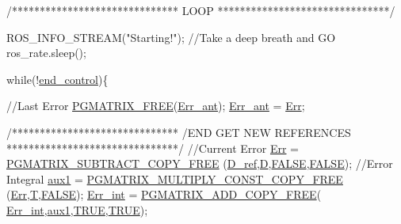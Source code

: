 \begin{DoxyCode}
        \textcolor{comment}{/******************************}
\textcolor{comment}{                        LOOP}
\textcolor{comment}{        *******************************/}

        ROS\_INFO\_STREAM(\textcolor{stringliteral}{"Starting!"});
        \textcolor{comment}{//Take a deep breath and GO}
        ros\_rate.sleep();

        \textcolor{keywordflow}{while}(!\hyperlink{classCartesian__controller_a3c0a72214891f68e2bad63bf2b688f9c}{end\_control})\{

                \textcolor{comment}{//Last Error}
                \hyperlink{gmatrix_8h_a9a73b4e0a77f386c0bae1bba75298d1d}{PGMATRIX\_FREE}(\hyperlink{classCartesian__controller_a6d9471a983f6cb6c642bf8dea0d540af}{Err\_ant});
                \hyperlink{classCartesian__controller_a6d9471a983f6cb6c642bf8dea0d540af}{Err\_ant} = \hyperlink{classCartesian__controller_ab3f08ecf10cb2486e8bfc61f07e2bde6}{Err};

                \textcolor{comment}{/******************************}
\textcolor{comment}{                        /END GET NEW REFERENCES}
\textcolor{comment}{                *******************************/}
                \textcolor{comment}{//Current Error}
                \hyperlink{classCartesian__controller_ab3f08ecf10cb2486e8bfc61f07e2bde6}{Err} =     \hyperlink{gmatrix__plus_8h_a146d9062e4325cc3b97990ae51b96d95}{PGMATRIX\_SUBTRACT\_COPY\_FREE}
      (\hyperlink{classCartesian__controller_abb248cb3215a574fe8e1bb8fb0b8626d}{D\_ref},\hyperlink{classCartesian__controller_a8c470b652ce436d8e48f126073fc2593}{D},\hyperlink{gmatlabdatafile_8h_aa93f0eb578d23995850d61f7d61c55c1}{FALSE},\hyperlink{gmatlabdatafile_8h_aa93f0eb578d23995850d61f7d61c55c1}{FALSE});
                \textcolor{comment}{//Error Integral}
                \hyperlink{classCartesian__controller_a37edb9c6e2a5066f74941e3659f68cbc}{aux1} =        \hyperlink{gmatrix__plus_8h_a371a0bfffdb84cf1596ca60bbf7fce93}{PGMATRIX\_MULTIPLY\_CONST\_COPY\_FREE}
      (\hyperlink{classCartesian__controller_ab3f08ecf10cb2486e8bfc61f07e2bde6}{Err},\hyperlink{classCartesian__controller_a35c6ddbb9624878f2807ff644a33e832}{T},\hyperlink{gmatlabdatafile_8h_aa93f0eb578d23995850d61f7d61c55c1}{FALSE});
                \hyperlink{classCartesian__controller_a248174c6399a8933bfcc8f1b0b39af5e}{Err\_int} = \hyperlink{gmatrix__plus_8h_aa1123306aa55d942955e09156db757a3}{PGMATRIX\_ADD\_COPY\_FREE}(
      \hyperlink{classCartesian__controller_a248174c6399a8933bfcc8f1b0b39af5e}{Err\_int},\hyperlink{classCartesian__controller_a37edb9c6e2a5066f74941e3659f68cbc}{aux1},\hyperlink{gmatlabdatafile_8h_aa8cecfc5c5c054d2875c03e77b7be15d}{TRUE},\hyperlink{gmatlabdatafile_8h_aa8cecfc5c5c054d2875c03e77b7be15d}{TRUE});


\end{DoxyCode}
